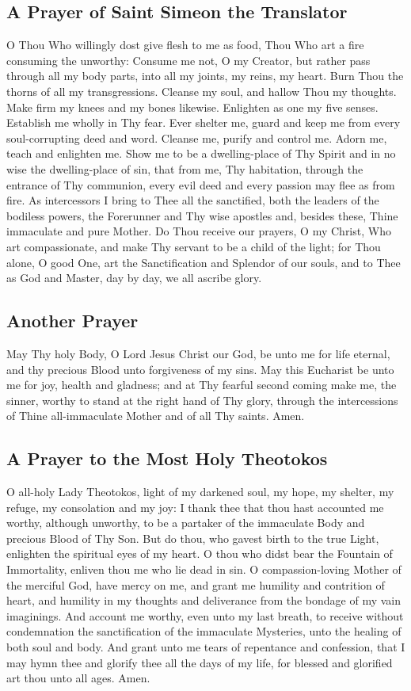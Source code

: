 \subsection*{A Prayer of Saint Simeon the Translator}
O Thou Who willingly dost give flesh to me as food,
Thou Who art a fire consuming the unworthy:
Consume me not, O my Creator, 
but rather pass through all my body parts, into all my joints,
my reins, my heart. Burn Thou the thorns of all my transgressions.
Cleanse my soul, and hallow Thou my thoughts.
Make firm my knees and my bones likewise.
Enlighten as one my five senses.
Establish me wholly in Thy fear. Ever shelter me, 
guard and keep me from every soul-corrupting deed and word.
Cleanse me, purify and control me. Adorn me, teach and enlighten me.
Show me to be a dwelling-place of Thy Spirit and in no wise
the dwelling-place of sin, that from me, Thy habitation,
through the entrance of Thy communion, 
every evil deed and every passion may flee as from fire.
As intercessors I bring to Thee all the sanctified,
both the leaders of the bodiless powers, the Forerunner
and Thy wise apostles and, besides these,
Thine immaculate and pure Mother. Do Thou receive our prayers,
O my Christ, Who art compassionate,
and make Thy servant to be a child of the light;
for Thou alone, O good One, art the Sanctification and Splendor
of our souls, and to Thee as God and Master, day by day,
we all ascribe glory.

\subsection*{Another Prayer}
May Thy holy Body, O Lord Jesus Christ our God, 
be unto me for life eternal, and thy precious Blood
unto forgiveness of my sins.
May this Eucharist be unto me for joy, health and gladness;
and at Thy fearful second coming make me,
the sinner, worthy to stand at the right hand of Thy glory,
through the intercessions of Thine all-immaculate Mother
and of all Thy saints. Amen.

\subsection*{A Prayer to the Most Holy Theotokos}
O all-holy Lady Theotokos, light of my darkened soul, my hope, 
my shelter, my refuge, my consolation and my joy:
I thank thee that thou hast accounted me worthy, although unworthy,
to be a partaker of the immaculate Body and precious Blood of Thy
Son. But do thou, who gavest birth to the true Light,
enlighten the spiritual eyes of my heart.
O thou who didst bear the Fountain of Immortality,
enliven thou me who lie dead in sin.
O compassion-loving Mother of the merciful God, have mercy on me,
and grant me humility and contrition of heart,
and humility in my thoughts and deliverance from the bondage
of my vain imaginings. And account me worthy,
even unto my last breath, to receive without condemnation
the sanctification of the immaculate Mysteries,
unto the healing of both soul and body.
And grant unto me tears of repentance and confession, 
that I may hymn thee and glorify thee all the days of my life,
for blessed and glorified art thou unto all ages. Amen.

